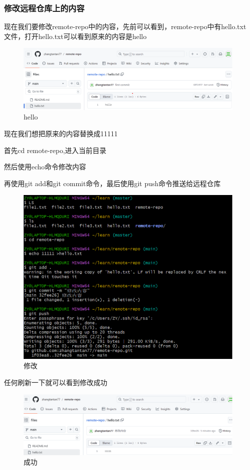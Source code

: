 \documentclass{ctexart}
\begin{document}
	\subsubsection{修改远程仓库上的内容}
	现在我们要修改remote-repo中的内容，先前可以看到，remote-repo中有hello.txt文件，打开hello.txt可以看到原来的内容是hello
	\begin{figure}[H]
		\centering
		\includegraphics[scale=0.5]{27}
		\caption{hello}
	\end{figure}
	
	现在我们想把原来的内容替换成11111
	
	首先cd remote-repo,进入当前目录
	
	然后使用echo命令修改内容
	
	再使用git add和git commit命令，最后使用git push命令推送给远程仓库
	
	\begin{figure}[H]
		\centering
		\includegraphics[scale=0.5]{28}
		\caption{修改}
	\end{figure}
	
	任何刷新一下就可以看到修改成功
	\begin{figure}[H]
		\centering
		\includegraphics[scale=0.5]{29}
		\caption{成功}
	\end{figure}
	
\end{document}
